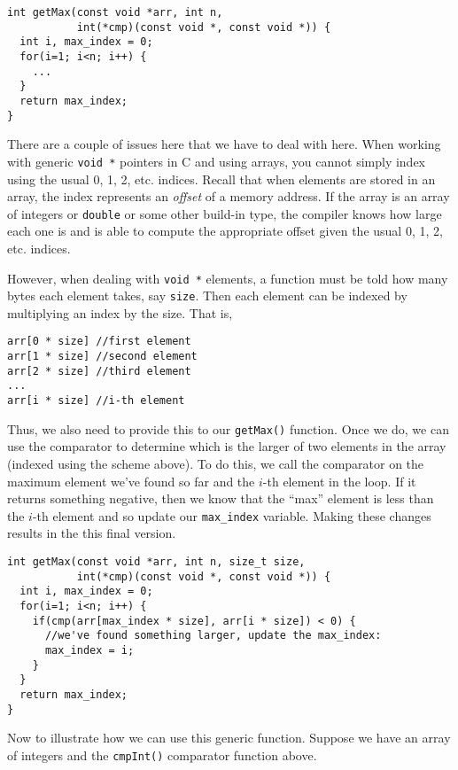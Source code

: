 \begin{verbatim}
int getMax(const void *arr, int n, 
           int(*cmp)(const void *, const void *)) {
  int i, max_index = 0;
  for(i=1; i<n; i++) {
    ...
  }
  return max_index;
}
\end{verbatim}

There are a couple of issues here that we have to deal with here.  When
working with generic \texttt{void *} pointers in C and using arrays, 
you cannot simply index using the usual 0, 1, 2, etc. indices.  Recall that 
when elements are stored in an array, the index represents an \emph{offset} 
of a memory address.  If the array is an array of integers or 
\texttt{double} or some other build-in type, the compiler knows how 
large each one is and is able to compute the appropriate offset given the 
usual 0, 1, 2, etc. indices.
	
However, when dealing with \texttt{void *} elements, a function must 
be told how many bytes each element takes, say \texttt{size}.  Then 
each element can be indexed by multiplying an index by the size.  That is, 

\begin{verbatim}
arr[0 * size] //first element
arr[1 * size] //second element
arr[2 * size] //third element
...
arr[i * size] //i-th element
\end{verbatim}

Thus, we also need to provide this to our \texttt{getMax()} function.
Once we do, we can use the comparator to determine which is the larger of
two elements in the array (indexed using the scheme above).  To do this, we
call the comparator on the maximum element we've found so far and the 
$i$-th element in the loop.  If it returns something negative, then we know
that the ``max'' element is less than the $i$-th element and so update our 
\texttt{max_index} variable.  Making these changes results in the
this final version.

\begin{verbatim}
int getMax(const void *arr, int n, size_t size, 
           int(*cmp)(const void *, const void *)) {
  int i, max_index = 0;
  for(i=1; i<n; i++) {
    if(cmp(arr[max_index * size], arr[i * size]) < 0) {
      //we've found something larger, update the max_index:
      max_index = i;
    }
  }
  return max_index;
}
\end{verbatim}

Now to illustrate how we can use this generic function.  Suppose we have
an array of integers and the \texttt{cmpInt()} comparator function
above.  


